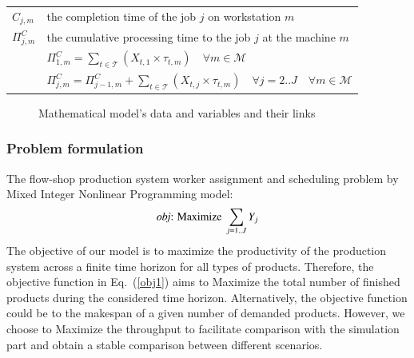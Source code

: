 \documentclass[review,12pt, 3p, times]{elsarticle}
\begin{document}
\begin{longtable}{p{} p{}}
    $C_{j,m}$     & the completion time of the job $j$ on workstation  $m$\\
    $\Pi^C_{j,m}$ & the cumulative processing time to the job $j$ at the machine $m$\\
	             & $\Pi^C_{1,m} = \sum_{t\in \mathcal{T}} (X_{t,1} \times\tau_{t,m})\quad\forall m \in\mathcal{M}$\\
	             & $\Pi^C_{j,m} =\Pi^C_{j-1,m} +  \sum_{t\in \mathcal{T}} (X_{t,j} \times \tau_{t,m} ) \quad\forall j=2..J \quad\forall m \in\mathcal{M}$  \\							
    \hline
\end{longtable}		
	
\begin{figure}[htbp]
	\centering
	\caption{Mathematical model's data and variables and their links}
	\label{fig:ModelVariablesLinks2}
\end{figure}
					
					              
\subsubsection{Problem formulation}
The  flow-shop production system worker assignment and scheduling problem  by Mixed Integer Nonlinear Programming  model:
\begin{equation}
	\text{{\it obj}: Maximize } \sum_{j=1..J}Y_j\label{obj1}
\end{equation} 		
The objective of our model is to maximize the productivity of the production system across a finite time horizon for all types of products. Therefore, the objective function in Eq.~(\ref{obj1}) aims to Maximize the total number of finished products during the considered time horizon. Alternatively, the objective function could be to  the makespan of a given number of demanded products. However, we choose to Maximize the throughput to facilitate comparison with the simulation part and obtain a stable comparison between different scenarios.
	
\end{document}
